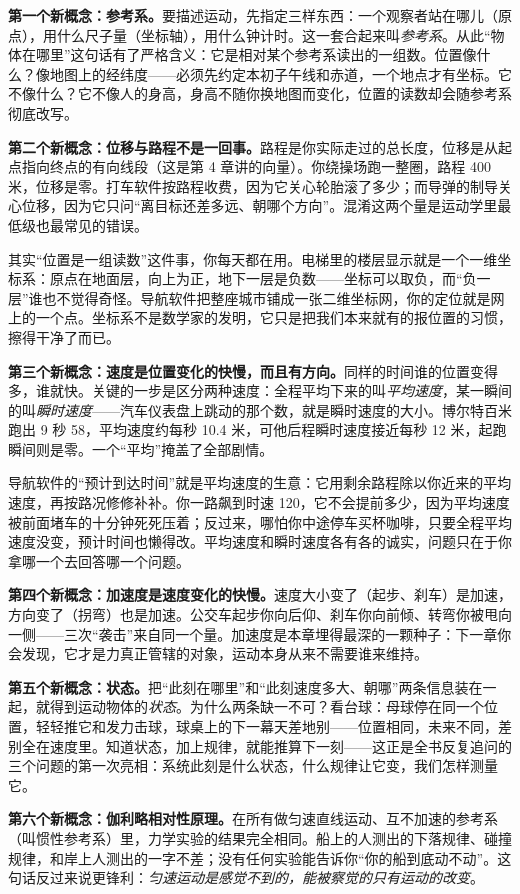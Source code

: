 \begin{mainline}
\textbf{第一个新概念：参考系。}要描述运动，先指定三样东西：一个观察者站在哪儿（原点），用什么尺子量（坐标轴），用什么钟计时。这一套合起来叫\emph{参考系}。从此“物体在哪里”这句话有了严格含义：它是相对某个参考系读出的一组数。位置像什么？像地图上的经纬度——必须先约定本初子午线和赤道，一个地点才有坐标。它不像什么？它不像人的身高，身高不随你换地图而变化，位置的读数却会随参考系彻底改写。

\textbf{第二个新概念：位移与路程不是一回事。}路程是你实际走过的总长度，位移是从起点指向终点的有向线段（这是第 4 章讲的向量）。你绕操场跑一整圈，路程 400 米，位移是零。打车软件按路程收费，因为它关心轮胎滚了多少；而导弹的制导关心位移，因为它只问“离目标还差多远、朝哪个方向”。混淆这两个量是运动学里最低级也最常见的错误。

其实“位置是一组读数”这件事，你每天都在用。电梯里的楼层显示就是一个一维坐标系：原点在地面层，向上为正，地下一层是负数——坐标可以取负，而“负一层”谁也不觉得奇怪。导航软件把整座城市铺成一张二维坐标网，你的定位就是网上的一个点。坐标系不是数学家的发明，它只是把我们本来就有的报位置的习惯，擦得干净了而已。

\textbf{第三个新概念：速度是位置变化的快慢，而且有方向。}同样的时间谁的位置变得多，谁就快。关键的一步是区分两种速度：全程平均下来的叫\emph{平均速度}，某一瞬间的叫\emph{瞬时速度}——汽车仪表盘上跳动的那个数，就是瞬时速度的大小。博尔特百米跑出 9 秒 58，平均速度约每秒 10.4 米，可他后程瞬时速度接近每秒 12 米，起跑瞬间则是零。一个“平均”掩盖了全部剧情。

导航软件的“预计到达时间”就是平均速度的生意：它用剩余路程除以你近来的平均速度，再按路况修修补补。你一路飙到时速 120，它不会提前多少，因为平均速度被前面堵车的十分钟死死压着；反过来，哪怕你中途停车买杯咖啡，只要全程平均速度没变，预计时间也懒得改。平均速度和瞬时速度各有各的诚实，问题只在于你拿哪一个去回答哪一个问题。

\textbf{第四个新概念：加速度是速度变化的快慢。}速度大小变了（起步、刹车）是加速，方向变了（拐弯）也是加速。公交车起步你向后仰、刹车你向前倾、转弯你被甩向一侧——三次“袭击”来自同一个量。加速度是本章埋得最深的一颗种子：下一章你会发现，它才是力真正管辖的对象，运动本身从来不需要谁来维持。

\textbf{第五个新概念：状态。}把“此刻在哪里”和“此刻速度多大、朝哪”两条信息装在一起，就得到运动物体的\emph{状态}。为什么两条缺一不可？看台球：母球停在同一个位置，轻轻推它和发力击球，球桌上的下一幕天差地别——位置相同，未来不同，差别全在速度里。知道状态，加上规律，就能推算下一刻——这正是全书反复追问的三个问题的第一次亮相：系统此刻是什么状态，什么规律让它变，我们怎样测量它。

\textbf{第六个新概念：伽利略相对性原理。}在所有做匀速直线运动、互不加速的参考系（叫惯性参考系）里，力学实验的结果完全相同。船上的人测出的下落规律、碰撞规律，和岸上人测出的一字不差；没有任何实验能告诉你“你的船到底动不动”。这句话反过来说更锋利：\emph{匀速运动是感觉不到的，能被察觉的只有运动的改变}。
\end{mainline}

